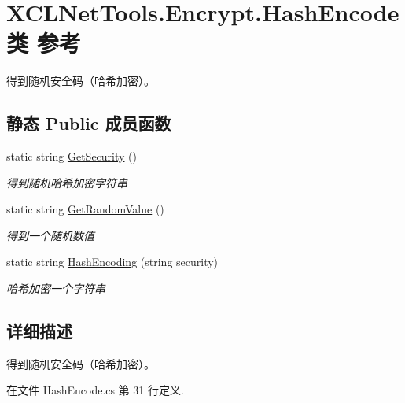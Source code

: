 \hypertarget{class_x_c_l_net_tools_1_1_encrypt_1_1_hash_encode}{\section{X\-C\-L\-Net\-Tools.\-Encrypt.\-Hash\-Encode类 参考}
\label{class_x_c_l_net_tools_1_1_encrypt_1_1_hash_encode}
}


得到随机安全码（哈希加密）。  


\subsection*{静态 Public 成员函数}
\begin{DoxyCompactItemize}
\item 
static string \hyperlink{class_x_c_l_net_tools_1_1_encrypt_1_1_hash_encode_aa9bb322a56c4ccb43846364c342286ab}{Get\-Security} ()
\begin{DoxyCompactList}\small\item\em 得到随机哈希加密字符串 \end{DoxyCompactList}\item 
static string \hyperlink{class_x_c_l_net_tools_1_1_encrypt_1_1_hash_encode_a2b9a5aeb95feb8b89aa9251945948599}{Get\-Random\-Value} ()
\begin{DoxyCompactList}\small\item\em 得到一个随机数值 \end{DoxyCompactList}\item 
static string \hyperlink{class_x_c_l_net_tools_1_1_encrypt_1_1_hash_encode_a274d0413fc6c3ce6ba24300fab20fee8}{Hash\-Encoding} (string security)
\begin{DoxyCompactList}\small\item\em 哈希加密一个字符串 \end{DoxyCompactList}\end{DoxyCompactItemize}


\subsection{详细描述}
得到随机安全码（哈希加密）。 



在文件 Hash\-Encode.\-cs 第 31 行定义.



